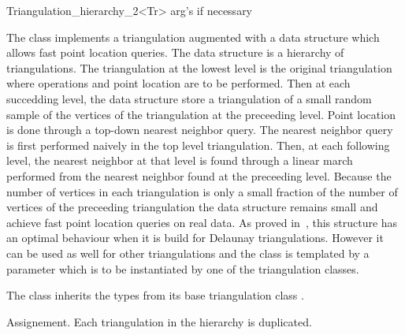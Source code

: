 

\begin{ccRefClass}{Triangulation_hierarchy_2<Tr>}  %
arg's if necessary

\ccDefinition
The class \ccRefName implements a triangulation augmented with
a data structure which allows fast point location
queries.
The
data structure  is a hierarchy 
of triangulations. The triangulation at the lowest level is
 the original triangulation where operations and point location are to 
be performed.
Then at each succedding level, the data structure
store a triangulation of a small random sample of the vertices
of the triangulation at the preceeding level. Point location
is done through a top-down nearest neighbor query.
The nearest neighbor query is first
performed naively in the top level triangulation.
Then, at each following level, the nearest neighbor at that level
is found through a linear march performed from
the nearest neighbor found at the preceeding level.
Because the number of vertices in each triangulation is only a small
fraction
of the number of vertices of the preceeding triangulation 
the data structure remains small and achieve fast point location 
queries  on real
data. As proved in~\cite{d-iirdt-98}, this structure has an optimal behaviour
when it is build for Delaunay triangulations.
However it can be used as well for other triangulations
and the 
\ccRefName class is templated by a parameter
which is to be instantiated by one of the \cgal triangulation
classes.


\ccInheritsFrom



\ccTypes
The class \ccRefName inherits the types from its base triangulation
class . 

\ccCreation
{}  %

\ccGlue
{}
\ccGlue
{}
{Assignement. Each triangulation in the hierarchy is duplicated.}
\ccGlue
{}


\end{ccRefClass}
